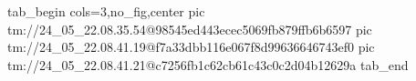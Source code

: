  
 
 
 
 

\qqSecOrig

% 
\ifcmt
  tab_begin cols=3,no_fig,center
 pic tm://24_05_22.08.35.54@98545ed443ecec5069fb879ffb6b6597
 pic tm://24_05_22.08.41.19@f7a33dbb116e067f8d99636646743ef0
 pic tm://24_05_22.08.41.21@c7256fb1c62cb61c43c0c2d04b12629a
  tab_end
\fi
